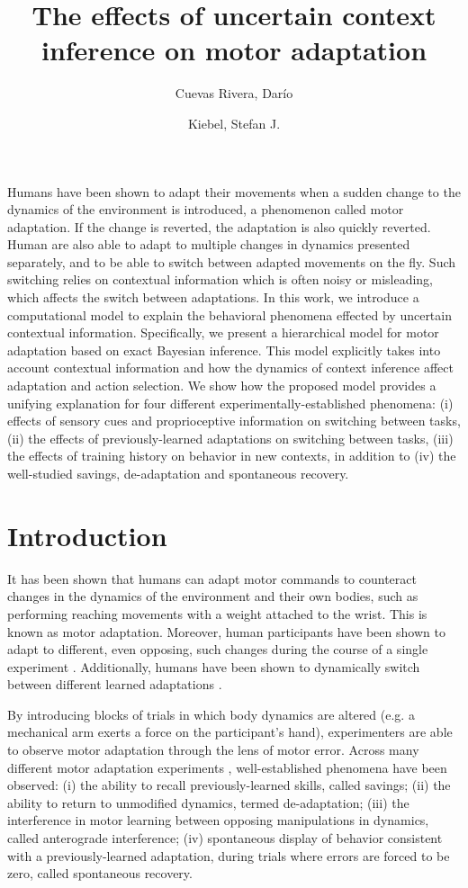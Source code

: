 \documentclass[a4paper,doc,floatsintext,natbib]{apa6}%
\title{The effects of uncertain context inference on motor adaptation}
\author[1,2]{Cuevas Rivera, Darío}
\author[1,2]{Kiebel, Stefan J.}
\affil[1]{Chair of Neuroimaging, Faculty of Psychology, Technische Universität Dresden, 01062 Dresden, Germany.}
\affil[2]{Centre for Tactile Internet with Human-in-the-Loop (CeTI)}
\affiliation{~}
\begin{document}
\maketitle

Humans have been shown to adapt their movements when a sudden change to the dynamics of the environment is introduced, a phenomenon called motor adaptation. If the change is reverted, the adaptation is also quickly reverted. Human are also able to adapt to multiple changes in dynamics presented separately, and to be able to switch between adapted movements on the fly. Such switching relies on contextual information which is often noisy or misleading, which affects the switch between adaptations. In this work, we introduce a computational model to explain the behavioral phenomena effected by uncertain contextual information. Specifically, we present a hierarchical model for motor adaptation based on exact Bayesian inference. This model explicitly takes into account contextual information and how the dynamics of context inference affect adaptation and action selection. We show how the proposed model provides a unifying explanation for four different experimentally-established phenomena: (i) effects of sensory cues and proprioceptive information on switching between tasks, (ii) the effects of previously-learned adaptations on switching between tasks, (iii) the effects of training history on behavior in new contexts, in addition to (iv) the well-studied savings, de-adaptation and spontaneous recovery.


\section{Introduction}
It has been shown that humans can adapt motor commands to counteract changes in the dynamics of the environment and their own bodies, such as performing reaching movements with a weight attached to the wrist. This is known as motor adaptation. Moreover, human participants have been shown to adapt to different, even opposing, such changes during the course of a single experiment \citep{Gandolfo_Motor_1996,Shadmehr_Functional_1997}. Additionally, humans have been shown to dynamically switch between different learned adaptations \citep{Davidson_Scaling_2004,Ethier_Spontaneous_2008,Lee_Dual_2009}.

By introducing blocks of trials in which body dynamics are altered (e.g. a mechanical arm exerts a force on the participant's hand), experimenters are able to observe motor adaptation through the lens of motor error. Across many different motor adaptation experiments \citep[e.g.][]{Gandolfo_Motor_1996,Shadmehr_Adaptive_1994,Davidson_Scaling_2004}, well-established phenomena have been observed: (i) the ability to recall previously-learned skills, called savings; (ii) the ability to return to unmodified dynamics, termed de-adaptation; (iii) the interference in motor learning between opposing manipulations in dynamics, called anterograde interference; (iv) spontaneous display of behavior consistent with a previously-learned adaptation, during trials where errors are forced to be zero, called spontaneous recovery.
\end{document}
